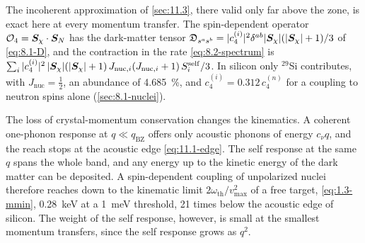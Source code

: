 \noindent The incoherent approximation of \cref{sec:11.3}, there valid only far above the zone, is exact here at every momentum transfer. The spin-dependent operator $\mathcal{O}_4 = \bm{S}_\chi\cdot\bm{S}_N$ has the dark-matter tensor $\mathfrak{D}_{s^as^b} = |c_4^{(i)}|^2\delta^{ab}|\bm{S}_\chi|(|\bm{S}_\chi| + 1)/3$ of \cref{eq:8.1-D}, and the contraction in the rate \cref{eq:8.2-spectrum} is $\sum_i|c_4^{(i)}|^2\,|\bm{S}_\chi|(|\bm{S}_\chi| + 1)\,J_{\mathrm{nuc},i}(J_{\mathrm{nuc},i} + 1)\,S^{\mathrm{self}}_i/3$. In silicon only $^{29}$Si contributes, with $J_{\mathrm{nuc}} = \frac12$, an abundance of \SI{4.685}{\percent}, and $c_4^{(i)} = 0.312\,c_4^{(n)}$ for a coupling to neutron spins alone (\cref{sec:8.1-nuclei}).

The loss of crystal-momentum conservation changes the kinematics. A coherent one-phonon response at $q \ll q_{\mathrm{BZ}}$ offers only acoustic phonons of energy $c_\nu q$, and the reach stops at the acoustic edge \cref{eq:11.1-edge}. The self response at the same $q$ spans the whole band, and any energy up to the kinetic energy of the dark matter can be deposited. A spin-dependent coupling of unpolarized nuclei therefore reaches down to the kinematic limit $2\omega_{\mathrm{th}}/v_{\mathrm{max}}^2$ of a free target, \cref{eq:1.3-mmin}, \SI{0.28}{keV} at a \SI{1}{meV} threshold, 21 times below the acoustic edge of silicon. The weight of the self response, however, is small at the smallest momentum transfers, since the self response grows as $q^2$.


